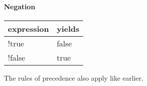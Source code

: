 \paragraph{Negation}

\begin{center}
  \ttfamily
  \begin{tabular}{l@{\qquad}l}
    {\normalfont expression} & {\normalfont yields} \\
    \midrule
    !true   & false \\
    !false  & true \\
    \midrule
  \end{tabular}
\end{center}

The rules of precedence also apply like earlier.
